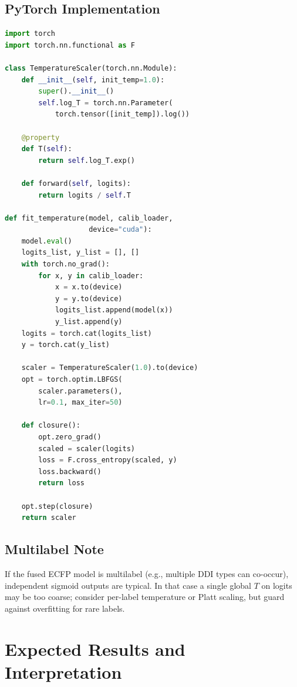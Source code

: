 \documentclass[11pt,a4paper,twocolumn]{article}
\begin{document}
\subsection{PyTorch Implementation}

\begin{lstlisting}[language=Python,caption={Minimal temperature scaling
in PyTorch.}]
import torch
import torch.nn.functional as F

class TemperatureScaler(torch.nn.Module):
    def __init__(self, init_temp=1.0):
        super().__init__()
        self.log_T = torch.nn.Parameter(
            torch.tensor([init_temp]).log())

    @property
    def T(self):
        return self.log_T.exp()

    def forward(self, logits):
        return logits / self.T

def fit_temperature(model, calib_loader,
                    device="cuda"):
    model.eval()
    logits_list, y_list = [], []
    with torch.no_grad():
        for x, y in calib_loader:
            x = x.to(device)
            y = y.to(device)
            logits_list.append(model(x))
            y_list.append(y)
    logits = torch.cat(logits_list)
    y = torch.cat(y_list)

    scaler = TemperatureScaler(1.0).to(device)
    opt = torch.optim.LBFGS(
        scaler.parameters(),
        lr=0.1, max_iter=50)

    def closure():
        opt.zero_grad()
        scaled = scaler(logits)
        loss = F.cross_entropy(scaled, y)
        loss.backward()
        return loss

    opt.step(closure)
    return scaler
\end{lstlisting}

\subsection{Multilabel Note}
If the fused ECFP model is multilabel (e.g., multiple DDI types can
co-occur), independent sigmoid outputs are typical.
In that case a single global $T$ on logits may be too coarse; consider
per-label temperature or Platt scaling, but guard against overfitting for
rare labels.

\section{Expected Results and Interpretation}
\end{document}
